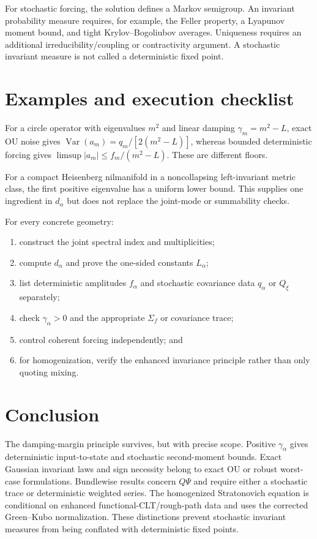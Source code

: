 \documentclass[11pt]{article}
\begin{document}
For stochastic forcing, the solution defines a Markov semigroup. An invariant
probability measure requires, for example, the Feller property, a Lyapunov
moment bound, and tight Krylov--Bogoliubov averages. Uniqueness requires an
additional irreducibility/coupling or contractivity argument. A stochastic
invariant measure is not called a deterministic fixed point.

\section{Examples and execution checklist}

For a circle operator with eigenvalues $m^2$ and linear damping
$\gamma_m=m^2-L$, exact OU noise gives
$\operatorname{Var}(a_m)=q_m/[2(m^2-L)]$, whereas bounded deterministic forcing
gives $\limsup|a_m|\le f_m/(m^2-L)$. These are different floors.

For a compact Heisenberg nilmanifold in a noncollapsing left-invariant metric
class, the first positive eigenvalue has a uniform lower bound. This supplies
one ingredient in $d_\alpha$ but does not replace the joint-mode or summability
checks.

For every concrete geometry:
\begin{enumerate}
\item construct the joint spectral index and multiplicities;
\item compute $d_\alpha$ and prove the one-sided constants $L_\alpha$;
\item list deterministic amplitudes $f_\alpha$ and stochastic covariance data
$q_\alpha$ or $Q_\xi$ separately;
\item check $\gamma_\alpha>0$ and the appropriate $\Sigma_f$ or covariance
trace;
\item control coherent forcing independently; and
\item for homogenization, verify the enhanced invariance principle rather than
only quoting mixing.
\end{enumerate}

\section{Conclusion}

The damping-margin principle survives, but with precise scope. Positive
$\gamma_\alpha$ gives deterministic input-to-state and stochastic
second-moment bounds. Exact Gaussian invariant laws and sign necessity belong
to exact OU or robust worst-case formulations. Bundlewise results concern
$Q\Psi$ and require either a stochastic trace or deterministic weighted
series. The homogenized Stratonovich equation is conditional on enhanced
functional-CLT/rough-path data and uses the corrected Green--Kubo
normalization. These distinctions prevent stochastic invariant measures from
being conflated with deterministic fixed points.
\end{document}
